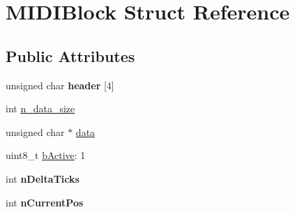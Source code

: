 \hypertarget{structMIDIBlock}{\section{M\-I\-D\-I\-Block Struct Reference}
\label{structMIDIBlock}
}
\subsection*{Public Attributes}
\begin{DoxyCompactItemize}
\item 
\hypertarget{structMIDIBlock_a02e4e52dba7225c6f89d42dc15446793}{unsigned char {\bfseries header} \mbox{[}4\mbox{]}}\label{structMIDIBlock_a02e4e52dba7225c6f89d42dc15446793}

\item 
int \hyperlink{structMIDIBlock_a20638ff9789b0deb8ece121078066931}{n\-\_\-data\-\_\-size}
\item 
unsigned char $\ast$ \hyperlink{structMIDIBlock_a69c7c7dbb87cd8eb4e2821ccc1aef4fb}{data}
\item 
uint8\-\_\-t \hyperlink{structMIDIBlock_a5df2dee4c1fffdf42975605a07680c84}{b\-Active}\-: 1
\item 
\hypertarget{structMIDIBlock_ac9e4e48fe46810eb7f1ab3ede1cd8ca5}{int {\bfseries n\-Delta\-Ticks}}\label{structMIDIBlock_ac9e4e48fe46810eb7f1ab3ede1cd8ca5}

\item 
\hypertarget{structMIDIBlock_accc0768255ba9970f96853f90136f745}{int {\bfseries n\-Current\-Pos}}\label{structMIDIBlock_accc0768255ba9970f96853f90136f745}

\end{DoxyCompactItemize}


